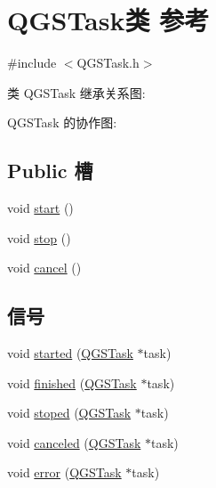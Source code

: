 \hypertarget{class_q_g_s_task}{}\section{Q\+G\+S\+Task类 参考}
\label{class_q_g_s_task}


{\ttfamily \#include $<$Q\+G\+S\+Task.\+h$>$}



类 Q\+G\+S\+Task 继承关系图\+:


Q\+G\+S\+Task 的协作图\+:
\subsection*{Public 槽}
\begin{DoxyCompactItemize}
\item 
void \mbox{\hyperlink{class_q_g_s_task_ace8c165d39458b4a2e411d02c70c2e2f}{start}} ()
\item 
void \mbox{\hyperlink{class_q_g_s_task_a34c4add1a5ab89a6054a7b00d376b2ef}{stop}} ()
\item 
void \mbox{\hyperlink{class_q_g_s_task_a9c058b9fada4eab81a985cafe5b7086c}{cancel}} ()
\end{DoxyCompactItemize}
\subsection*{信号}
\begin{DoxyCompactItemize}
\item 
void \mbox{\hyperlink{class_q_g_s_task_acda0849a1cceb9b118f44e0c53f92911}{started}} (\mbox{\hyperlink{class_q_g_s_task}{Q\+G\+S\+Task}} $\ast$task)
\item 
void \mbox{\hyperlink{class_q_g_s_task_a06748f4c6716626fad6a85d967e710ae}{finished}} (\mbox{\hyperlink{class_q_g_s_task}{Q\+G\+S\+Task}} $\ast$task)
\item 
void \mbox{\hyperlink{class_q_g_s_task_ab87f33f5aab99ded7d460a014a862692}{stoped}} (\mbox{\hyperlink{class_q_g_s_task}{Q\+G\+S\+Task}} $\ast$task)
\item 
void \mbox{\hyperlink{class_q_g_s_task_a6736a928905d4211a491b4dd7bb2dcb3}{canceled}} (\mbox{\hyperlink{class_q_g_s_task}{Q\+G\+S\+Task}} $\ast$task)
\item 
void \mbox{\hyperlink{class_q_g_s_task_a0ac4592b48e8de87af4f92c4a98a1763}{error}} (\mbox{\hyperlink{class_q_g_s_task}{Q\+G\+S\+Task}} $\ast$task)
\end{DoxyCompactItemize}
